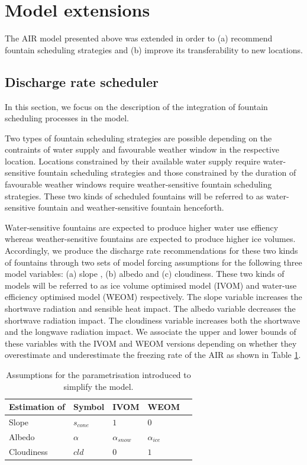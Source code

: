 \section{Model extensions}

The AIR model presented above was extended in order to (a) recommend fountain scheduling strategies and (b)
improve its transferability to new locations.

\subsection{Discharge rate scheduler}

In this section, we focus on the description of the integration of fountain scheduling processes in the model.

Two types of fountain scheduling strategies are possible depending on the contraints of water supply and
favourable weather window in the respective location. Locations constrained by their available water supply
require water-sensitive fountain scheduling strategies and those constrained by the duration of favourable
weather windows require weather-sensitive fountain scheduling strategies. These two kinds of scheduled fountains
will be referred to as water-sensitive fountain and weather-sensitive fountain henceforth.

Water-sensitive fountains are expected to produce higher water use effiency whereas weather-sensitive fountains
are expected to produce higher ice volumes. Accordingly, we produce the discharge rate recommendations for these
two kinds of fountains through two sets of model forcing assumptions for the following three model variables:
(a) slope , (b) albedo and (c) cloudiness.  These two kinds of models will be referred to as ice volume
optimised model (IVOM) and water-use efficiency optimised model (WEOM) respectively. The slope variable
increases the shortwave radiation and sensible heat impact. The albedo variable decreases the shortwave
radiation impact. The cloudiness variable increases both the shortwave and the longwave radiation impact. We
associate the upper and lower bounds of these variables with the IVOM and WEOM versions depending on whether
they overestimate and underestimate the freezing rate of the AIR as shown in Table \ref{tab:assumptions}.

\begin{table}[]
\centering
\caption{Assumptions for the parametrisation introduced to simplify the model.}
\label{tab:assumptions}
\begin{tabular}{@{}lllll@{}}
\toprule
\textbf{Estimation of} & \textbf{Symbol} & \textbf{IVOM} & \textbf{WEOM} & \\ \midrule
\multicolumn{1}{|l}{Slope}        & $s_{cone}$ & $ 1 $ & $0$ & \multicolumn{1}{l|}{} \\ \midrule
\multicolumn{1}{|l}{Albedo} & $\alpha$ & $\alpha_{snow}$ & $\alpha_{ice}$ & \multicolumn{1}{l|}{} \\\midrule 
\multicolumn{1}{|l}{Cloudiness}  & $cld$ & $0$ & $1$ & \multicolumn{1}{l|}{} \\ \bottomrule
\end{tabular}
\end{table}


